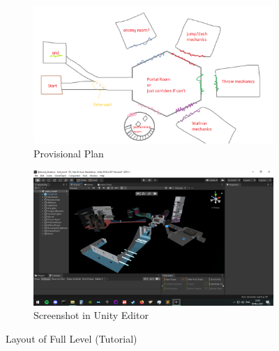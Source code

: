 \begin{figure}[H]
\centering
\begin{subfigure}{0.5\textwidth}
  \centering
  \includegraphics[width=1\linewidth]{Figures/fullplan.png}
  \caption{Provisional Plan}
\end{subfigure}%
\begin{subfigure}{0.5\textwidth}
  \centering
  \includegraphics[width=1\linewidth]{Figures/full.png}
  \caption{Screenshot in Unity Editor}
\end{subfigure}
\caption{Layout of Full Level (Tutorial)}
\end{figure}

